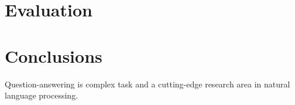\documentclass{acm_proc_article-sp}
\begin{document}

\section{Evaluation}
\label{sec:evaluation}



\section{Conclusions}
\label{sec:conclusion}

Question-answering is complex task and a cutting-edge research area
in natural language processing. 



%

 

%
\end{document}
